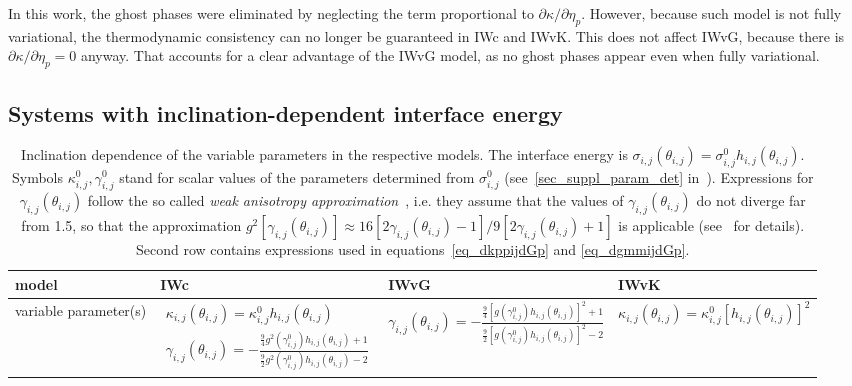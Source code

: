 In this work, the ghost phases were eliminated by neglecting the term proportional to $\partial \kappa/\partial \eta_p$. However, because such model is not fully variational, the thermodynamic consistency can no longer be guaranteed in IWc and IWvK. This does not affect IWvG, because there is $\partial \kappa/\partial\eta_p=0$ anyway. That accounts for a clear advantage of the IWvG model, as no ghost phases appear even when fully variational.

\subsection{Systems with inclination-dependent interface energy} \label{sec_model_incldepIE}
\begin{sidewaystable}[]
	\centering
	\caption{Inclination dependence of the variable parameters in the respective models. The interface energy is $\sigma_{i,j}(\theta_{i,j})=\sigma_{i,j}^0h_{i,j}(\theta_{i,j})$. Symbols $\kappa_{i,j}^0, \gamma_{i,j}^0$ stand for scalar values of the parameters determined from $\sigma_{i,j}^0$ (see~\ref{sec_suppl_param_det} in~\cite{Minar2021suppl}). Expressions for $\gamma_{i,j}(\theta_{i,j})$ follow the so called \textit{weak anisotropy approximation}~\cite{Moelans2008}, i.e. they assume that the values of $\gamma_{i,j}(\theta_{i,j})$ do not diverge far from 1.5, so that the approximation $g^2[\gamma_{i,j}(\theta_{i,j})]\approx16[2\gamma_{i,j}(\theta_{i,j})-1]/9[2\gamma_{i,j}(\theta_{i,j}) +1]$ is applicable (see~\cite{Moelans2008} for details). Second row contains expressions used in equations~\ref{eq_dkppijdGp} and \ref{eq_dgmmijdGp}.}
	\label{tab_models_comp__par_incldep}
	\begin{tabular}{p{2cm}|>{\centering\arraybackslash}p{5cm}>{\centering\arraybackslash}p{5cm}>{\centering\arraybackslash}p{4.2cm}}
		\toprule
		model     & IWc & IWvG & IWvK  \\ \hline
		variable parameter(s)     & $\begin{array}{l}
			\kappa_{i,j}(\theta_{i,j})= \kappa_{i,j}^0h_{i,j}(\theta_{i,j}) \\
			\gamma_{i,j}(\theta_{i,j})= -\frac{\frac{9}{4}g^2(\gamma_{i,j}^0)h_{i,j}(\theta_{i,j})+1}{\frac{9}{2}g^2(\gamma_{i,j}^0)h_{i,j}(\theta_{i,j})-2}
		\end{array}$
		& $\gamma_{i,j}(\theta_{i,j})= -\frac{\frac{9}{4}[g(\gamma_{i,j}^0)h_{i,j}(\theta_{i,j})]^2+1}{\frac{9}{2}[g(\gamma_{i,j}^0)h_{i,j}(\theta_{i,j})]^2-2}$
		&
		$\kappa_{i,j}(\theta_{i,j})= \kappa_{i,j}^0[h_{i,j}(\theta_{i,j})]^2$ \\ \hline

\end{tabular}
\end{sidewaystable}
